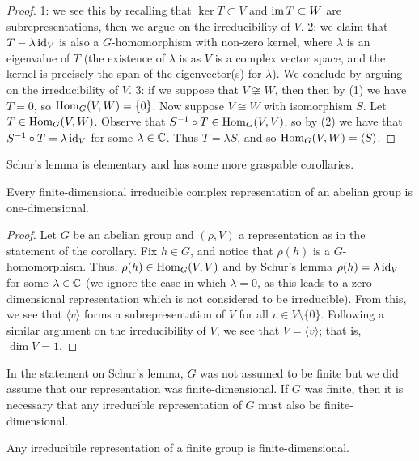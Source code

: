 \begin{proof}
  1: we see this by recalling that $\ker T \subset V$ and $\operatorname{im} T \subset W$ are subrepresentations, then we argue on the irreducibility of $V$.
  2: we claim that $T - \lambda\operatorname{id}_V$ is also a $G$-homomorphism with non-zero kernel, where $\lambda$ is an eigenvalue of $T$ (the existence of $\lambda$ is as $V$ is a complex vector space, and the kernel is precisely the span of the eigenvector(s) for $\lambda$). We conclude by arguing on the irreducibility of $V$.
  3: if we suppose that $V \not\cong W$, then then by (1) we have $T = 0$, so $\operatorname{Hom}_G(V, W) = \{0\}$. Now suppose $V \cong W$ with isomorphism $S$. Let $T \in \operatorname{Hom}_G(V, W)$. Observe that $S^{-1} \circ T \in \operatorname{Hom}_G(V,V)$, so by (2) we have that $S^{-1} \circ T = \lambda\operatorname{id}_V$ for some $\lambda \in \mathbb{C}$. Thus $T = \lambda S$, and so $\operatorname{Hom}_G(V,W) = \langle S \rangle$.
\end{proof}

Schur's lemma is elementary and has some more graspable corollaries.

\begin{corollary}
  Every finite-dimensional irreducible complex representation of an abelian group is one-dimensional.
\end{corollary}

\begin{proof}
  Let $G$ be an abelian group and $(\rho, V)$ a representation as in the statement of the corollary. Fix $h \in G$, and notice that $\rho(h)$ is a $G$-homomorphism. Thus, $\rho(h) \in \operatorname{Hom}_G(V,V)$ and by Schur's lemma $\rho(h) = \lambda \operatorname{id}_V$ for some $\lambda \in \mathbb{C}$ (we ignore the case in which $\lambda = 0$, as this leads to a zero-dimensional representation which is not considered to be irreducible). From this, we see that $\langle v \rangle$ forms a subrepresentation of $V$ for all $v \in V \setminus \{0\}$. Following a similar argument on the irreducibility of $V$, we see that $V = \langle v \rangle$; that is, $\dim V = 1$.
\end{proof}

In the statement on Schur's lemma, $G$ was not assumed to be finite but we did assume that our representation was finite-dimensional. If $G$ was finite, then it is necessary that any irreducible representation of $G$ must also be finite-dimensional.

\begin{proposition}
  Any irreducibile representation of a finite group is finite-dimensional.
\end{proposition}

